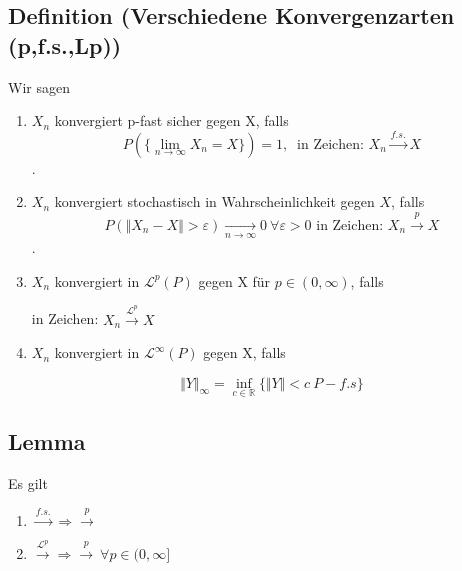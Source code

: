 \documentclass[german,10pt,oneside, fleqn, a4paper]{article}
\newcommand {\R}	{\mathbb{R}}
\newcommand {\N}	{\mathbb{N}}
\newcommand{\mc}[1]{\mathcal{#1}}
\newcommand{\1}[1]{1_{#1}}
\newcommand{\2}[1]{\1{\brac{#1}}}
\begin{document}
\subsection{Definition (Verschiedene Konvergenzarten (p,f.s.,Lp))}
Wir sagen \begin{enumerate}
\item $X_n$ konvergiert p-fast sicher gegen X, falls
\[P\left(\lbrace\lim\limits_{n\rightarrow\infty}X_n=X\rbrace\right)=1,\ \text{ in Zeichen: } X_n\xrightarrow{f.s.}X\].
\item $X_n$ konvergiert stochastisch in Wahrscheinlichkeit gegen $X$, falls \[ P\left(\Vert X_n-X\Vert >\varepsilon\right)\xrightarrow[n\rightarrow\infty]{}0\ \forall\varepsilon > 0\text{ in Zeichen: } X_n\xrightarrow{p}X\].
\item $X_n$ konvergiert in $\mc{L}^p\left(P\right)$ gegen X für $p\in(0,\infty)$, falls 
in Zeichen: $X_n\xrightarrow{\mc{L}^p}X$
\item $X_n$ konvergiert in $\mc{L}^\infty\left(P\right)$ gegen X, falls 
\[\Vert Y \Vert_\infty = \inf\limits_{c\in\R}\lbrace \Vert Y \Vert < c\ P-f.s\rbrace\]
\end{enumerate}


\subsection{Lemma}






Es gilt \begin{enumerate}[label=(\alph*)]
\item $\xrightarrow{f.s.}\Rightarrow\xrightarrow{p}$
\item $\xrightarrow{\mc{L}^p}\Rightarrow\xrightarrow{p}\ \forall p\in (0,\infty]$
\end{enumerate}
\end{document}
